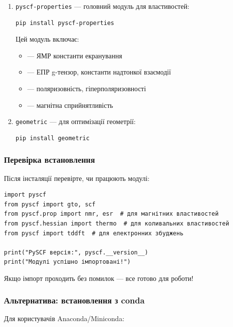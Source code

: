\begin{enumerate}
    \item \texttt{pyscf-properties} --- головний модуль для властивостей:
    \begin{verbatim}
pip install pyscf-properties
    \end{verbatim}

    Цей модуль включає:
    \begin{itemize}
        \item {} --- ЯМР константи екранування
        \item {} --- ЕПР g-тензор, константи надтонкої взаємодії
        \item {} --- поляризовність, гіперполяризовності
        \item {} --- магнітна сприйнятливість
    \end{itemize}

    \item \texttt{geometric} --- для оптимізації геометрії:
    \begin{verbatim}
pip install geometric
    \end{verbatim}
\end{enumerate}

\subsubsection*{Перевірка встановлення}

Після інсталяції перевірте, чи працюють модулі:

\begin{verbatim}
import pyscf
from pyscf import gto, scf
from pyscf.prop import nmr, esr  # для магнітних властивостей
from pyscf.hessian import thermo  # для коливальних властивостей
from pyscf import tddft  # для електронних збуджень

print("PySCF версія:", pyscf.__version__)
print("Модулі успішно імпортовані!")
\end{verbatim}


Якщо імпорт проходить без помилок --- все готово для роботи!

\subsubsection*{Альтернатива: встановлення з conda}

Для користувачів Anaconda/Miniconda:

